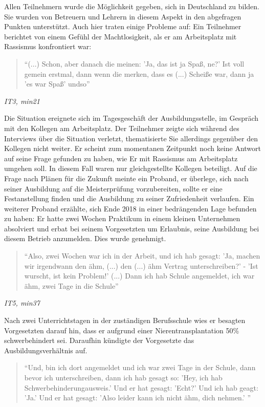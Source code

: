 Allen Teilnehmern wurde die Möglichkeit gegeben, sich in Deutschland zu bilden. Sie wurden von Betreuern und Lehrern in diesem Aspekt in den abgefragen Punkten unterstützt.
Auch hier traten einige Probleme auf:
Ein Teilnehmer berichtet von einem Gefühl der Machtlosigkeit, als er am Arbeitsplatz mit Rassismus konfrontiert war:
\begin{quote}
    ``(...) Schon, aber danach die meinen: 'Ja, das ist ja Spaß, ne?' Ist voll gemein erstmal, dann wenn die merken, dass es (...) Scheiße war, dann ja 'es war Spaß' undso''
\end{quote}
\centerline{\textit{IT3, min21}}
Die Situation ereignete sich im Tagesgeschäft der Ausbildungsstelle, im Gespräch mit den Kollegen am Arbeitsplatz. Der Teilnehmer zeigte sich während des Interviews über die Situation verletzt, thematisierte Sie allerdings gegenüber den Kollegen nicht weiter. Er scheint zum momentanen Zeitpunkt noch keine Antwort auf seine Frage gefunden zu haben, wie Er mit Rassismus am Arbeitsplatz umgehen soll. In diesem Fall waren nur gleichgestellte Kollegen beteiligt.\newline
Auf die Frage nach Plänen für die Zukunft meinte ein Proband, er überlege, sich nach seiner Ausbildung auf die Meisterprüfung vorzubereiten, sollte er eine Festanstellung finden und die Ausbildung zu seiner Zufriedenheit verlaufen.
Ein weiterer Proband erzählte, sich Ende 2018 in einer bedrängenden Lage befunden zu haben:
Er hatte zwei Wochen Praktikum in einem kleinen Unternehmen absolviert und erbat bei seinem Vorgesetzten um Erlaubnis, seine Ausbildung bei diesem Betrieb anzumelden. Dies wurde genehmigt.\newline
\begin{quote}
    ``Also, zwei Wochen war ich in der Arbeit, und ich hab gesagt: 'Ja, machen wir irgendwann den ähm, (...) den (...) ähm Vertrag unterschreiben?' - 'Ist wurscht, ist kein Problem!' (...) Dann ich hab Schule angemeldet, ich war ähm, zwei Tage in die Schule''
\end{quote}
\centerline{\textit{IT5, min37}}
Nach zwei Unterrichtstagen in der zuständigen Berufsschule wies er besagten Vorgesetzten darauf hin, dass er aufgrund einer Nierentransplantation 50\% schwerbehindert sei. Daraufhin kündigte der Vorgesetzte das Ausbildungsverhältnis auf.
\begin{quote}
    ``Und, bin ich dort angemeldet und ich war zwei Tage in der Schule, dann bevor ich unterschreiben, dann ich hab gesagt so: 'Hey, ich hab Schwerbehinderungausweis.' Und er hat gesagt: 'Echt?' Und ich hab geagt: 'Ja.' Und er hat gesagt: 'Also leider kann ich nicht ähm, dich nehmen.' ''
\end{quote}
